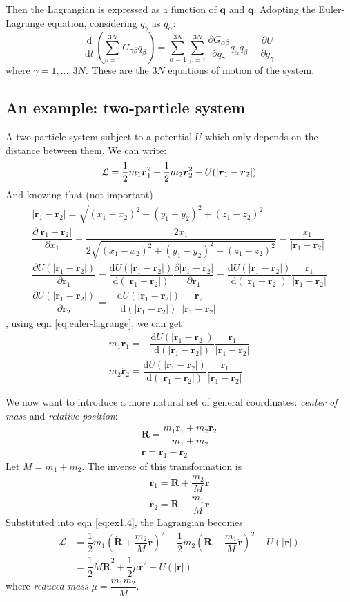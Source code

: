 \documentclass[
  10pt,
  twoside,
  openany,
  b5paper, %
  colorscheme = bootstrap-v4, %
]{qyxf-book}
\numberwithin{equation}{section}
\newcommand{\md}{\mathrm{d}}
\newcommand{\der}[2]{\dfrac{\md #1}{\md #2}}
\newcommand{\p}[2]{\dfrac{\partial #1}{\partial #2}}
\newcommand{\vr}{\boldsymbol{r}}
\newcommand{\vq}{\boldsymbol{q}}
\newcommand{\dvr}{\dot{\vr}}
\newcommand{\ddvr}{\ddot{\vr}}
\newcommand{\dvq}{\dot{\vq}}
\newcommand{\half}{\dfrac{1}{2}}
\newcommand{\suman}{\sum_{\alpha=1}^{3N}}
\newcommand{\lag}{\mathcal{L}} %
\begin{document}
Then the Lagrangian is expressed as a function of $\vq$ and $\dvq$. Adopting the Euler-Lagrange equation, considering $q_{\gamma}$ as $q_\alpha$:
\begin{equation}
	\der{}{t}\left(\sum_{\beta=1}^{3N}G_{\gamma\beta}\dot{q}_\beta\right)=\suman\sum_{\beta=1}^{3N}\p{G_{\alpha\beta}}{q_\gamma}\dot{q}_\alpha\dot{q}_\beta-\p{U}{q_\gamma} \label{eq:lag-equations}
\end{equation}
where $\gamma=1,\dots,3N$. These are the $3N$ equations of motion of the system.

\subsection{An example: two-particle system}
A two particle system subject to a potential $U$ which only depends on the distance between them. We can write:
\begin{equation}
	\lag=\half m_1\dvr_1^2+\half m_2\dvr_2^2-U(|\vr_1-\vr_2|) \label{eq:ex1.4}\\
\end{equation}
And knowing that (not important)
\begin{gather*}
	|\vr_1-\vr_2|=\sqrt{(x_1-x_2)^2+(y_1-y_2)^2+(z_1-z_2)^2}\\
	\p{|\vr_1-\vr_2|}{x_1}=\dfrac{2x_1}{2\sqrt{(x_1-x_2)^2+(y_1-y_2)^2+(z_1-z_2)^2}}=\dfrac{x_1}{|\vr_1-\vr_2|}\\
	\p{U(|\vr_1-\vr_2|)}{\vr_1}=\der{U(|\vr_1-\vr_2|)}{(|\vr_1-\vr_2|)}\p{|\vr_1-\vr_2|}{\vr_1}=\der{U(|\vr_1-\vr_2|)}{(|\vr_1-\vr_2|)}\dfrac{\vr_1}{|\vr_1-\vr_2|}\\
	\p{U(|\vr_1-\vr_2|)}{\vr_2}=-\der{U(|\vr_1-\vr_2|)}{(|\vr_1-\vr_2|)}\dfrac{\vr_2}{|\vr_1-\vr_2|}
\end{gather*}
, using eqn \ref{eq:euler-lagrange}, we can get
\begin{gather*}
	m_1\ddvr_1=-\der{U(|\vr_1-\vr_2|)}{(|\vr_1-\vr_2|)}\dfrac{\vr_1}{|\vr_1-\vr_2|}\\
	m_2\ddvr_2=\der{U(|\vr_1-\vr_2|)}{(|\vr_1-\vr_2|)}\dfrac{\vr_1}{|\vr_1-\vr_2|}
\end{gather*}

We now want to introduce a more natural set of general coordinates: \textit{center of mass} and \textit{relative position}:
\begin{gather*}
	\boldsymbol{R}=\dfrac{m_1\vr_1+m_2\vr_2}{m_1+m_2}\\
	\vr=\vr_1-\vr_2
\end{gather*}
Let $M=m_1+m_2$. The inverse of this transformation is
\begin{gather*}
	\vr_1=\boldsymbol{R}+\dfrac{m_2}{M}\vr\\
	\vr_2=\boldsymbol{R}-\dfrac{m_1}{M}\vr
\end{gather*}
Substituted into eqn \ref{eq:ex1.4}, the Lagrangian becomes
\begin{align*}
	\lag&=
	\half 
	m_1\left(\dot{\boldsymbol{R}}+\dfrac{m_2}{M}\dvr\right)^2+
	\half m_2\left(\dot{\boldsymbol{R}}-\dfrac{m_1}{M}\dvr\right)^2-U(|\vr|)\\
	&=\half M\dot{\boldsymbol{R}}^2+\half\mu\dvr^2-U(|\vr|)
\end{align*}
where \textit{reduced mass} $\mu=\dfrac{m_1m_2}{M}$.
\end{document}
